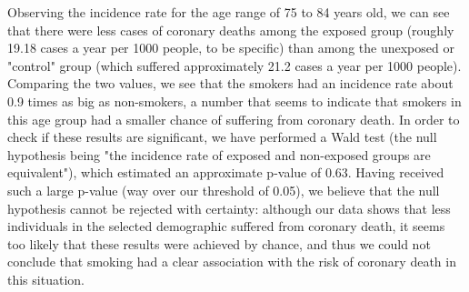 \documentclass[10pt,a4paper,twoside]{article}\usepackage[]{graphicx}\usepackage[]{xcolor}
\begin{document}
\begin{enumerate}
\begin{enumerate}
    Observing the incidence rate for the age range of 75 to 84 years old, we can see that there were less cases of coronary deaths among the exposed group (roughly 19.18 cases a year per 1000 people, to be specific) than among the unexposed or "control" group (which suffered approximately 21.2 cases a year per 1000 people). Comparing the two values, we see that the smokers had an incidence rate about 0.9 times as big as non-smokers, a number that seems to indicate that smokers in this age group had a smaller chance of suffering from coronary death. In order to check if these results are significant, we have performed a Wald test (the null hypothesis being "the incidence rate of exposed and non-exposed groups are equivalent"), which estimated an approximate p-value of 0.63. Having received such a large p-value (way over our threshold of 0.05), we believe that the null hypothesis cannot be rejected with certainty: although our data shows that less individuals in the selected demographic suffered from coronary death, it seems too likely that these results were achieved by chance, and thus we could not conclude that smoking had a clear association with the risk of coronary death in this situation.
    

\end{enumerate}
\end{enumerate}
\end{document}
